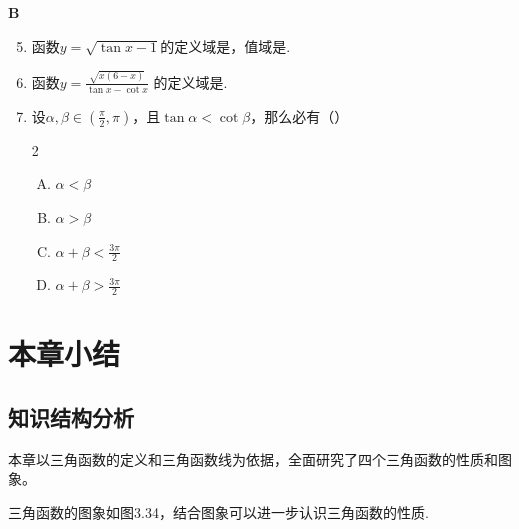 \begin{center}
    \bfseries B
\end{center}
\begin{enumerate}\setcounter{enumi}{4}
    \item 函数$y=\sqrt{\tan x-1}$的定义域是\blank，值域是\blank.
   
    \item   函数$y=\frac{\sqrt{x(6-x)}}{\tan x-\cot x}$ 的定义域是\blank.
    \item   设$\alpha,\beta\in \left(\frac{\pi}{2},\pi\right)$，且$\tan\alpha<\cot\beta$，那么必有（\qquad ）
\begin{multicols}{2}
\begin{enumerate}[(A)]
    \item $\alpha<\beta$
    \item $\alpha>\beta$
    \item $\alpha+\beta<\frac{3\pi}{2}$
    \item $\alpha+\beta>\frac{3\pi}{2}$
\end{enumerate}
\end{multicols}
\end{enumerate}


\section{本章小结}

\subsection*{知识结构分析}
本章以三角函数的定义和三角函数线为依据，全面研究了四个三角函数的性质和图象。

三角函数的图象如图3.34，结合图象可以进一步认识三角函数的性质.

